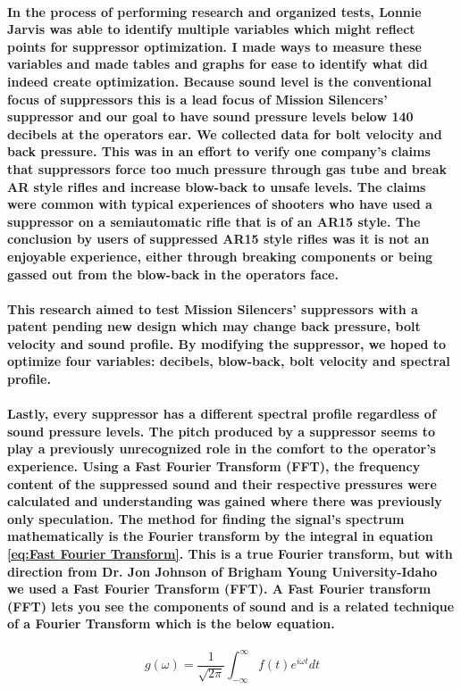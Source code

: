 \paragraph{In the process of performing research and organized tests, Lonnie Jarvis was able to identify multiple variables which might reflect points for suppressor optimization. I made ways to measure these variables and made tables and graphs for ease to identify what did indeed create optimization. Because sound level is the conventional focus of suppressors this is a lead focus of Mission Silencers' suppressor and our goal to have sound pressure levels below 140 decibels at the operators ear. We collected data for bolt velocity and back pressure. This was in an effort to verify one company's claims that suppressors force too much pressure through gas tube and break AR style rifles and increase blow-back to unsafe levels. The claims were common with typical experiences of shooters who have used a suppressor on a semiautomatic rifle that is of an AR15 style. The conclusion by users of suppressed AR15 style rifles was it is not an enjoyable experience, either through breaking components or being gassed out from the blow-back in the operators face.} 

\paragraph{This research aimed to test Mission Silencers' suppressors with a patent pending new design which may change back pressure, bolt velocity and sound profile. By modifying the suppressor, we hoped to optimize four variables: decibels, blow-back, bolt velocity and spectral profile.}

\paragraph{Lastly, every suppressor has a different spectral profile regardless of sound pressure levels. The pitch produced by a suppressor seems to play a previously unrecognized role in the comfort to the operator's experience. Using a Fast Fourier Transform (FFT), the frequency content of the suppressed sound and their respective pressures were calculated and understanding was gained where there was previously only speculation. The method for finding the signal's spectrum mathematically is the Fourier transform by the integral in equation \ref{eq:Fast Fourier Transform}. This is a true Fourier transform, but with direction from Dr. Jon Johnson of Brigham Young University-Idaho we used a Fast Fourier Transform (FFT). A Fast Fourier transform (FFT) lets you see the components of sound and is a related technique of a Fourier Transform which is the below equation.}


\Large
\begin{equation}
	g(\omega)=\frac{1}{\sqrt{2 \pi}} \int_{-\infty}^{\infty}f(t)e^{i \omega t} dt
	\label{eq:Fast Fourier Transform}
\end{equation}